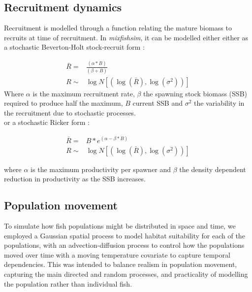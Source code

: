\documentclass[review]{elsarticle}
\begin{document}
\subsection{Recruitment dynamics}

Recruitment is modelled through a function relating the mature biomass to
recruits at time of recruitment. In \emph{mixfishsim}, it can be modelled
either either as a stochastic Beverton-Holt stock-recruit form
\citep{Beverton1957}: 

\begin{equation*}
	\begin{split}
	\bar{R} = & \frac{(\alpha * B)}{(\beta + B)} \\
	     R \sim & \log N[(\log(\bar{R}),\log(\sigma^2))]
	\end{split}
\end{equation*}
Where $\alpha$ is the maximum recruitment rate, $\beta$ the spawning stock
biomass (SSB) required to produce half the maximum, $B$ current SSB and
$\sigma^2$ the variability in the recruitment due to stochastic
processes. \\

or a stochastic Ricker form \citep{Ricker1954}:

\begin{equation*}
	\begin{split}
	\bar{R} = & B * e^{(\alpha - \beta * B)} \\	
   	     R \sim & \log N[(\log(\bar{R}),\log(\sigma^2))]
	\end{split}
\end{equation*}

where $\alpha$ is the maximum productivity per spawner and $\beta$ the density
dependent reduction in productivity as the SSB increases.

\subsection{Population movement}

To simulate how fish populations might be distributed in space and time, we
employed a Gaussian spatial process to model habitat suitability for each of
the populations, with an advection-diffusion process to control how the
populations moved over time with a moving temperature covariate to capture
temporal dependencies. This was intended to balance realism in population
movement, capturing the main directed and random processes, and practicality of
modelling the population rather than individual fish. \\
\end{document}

